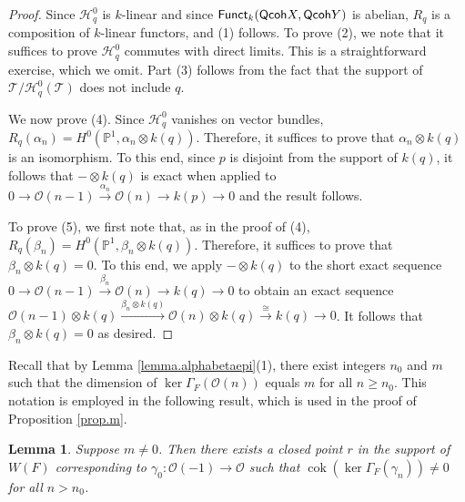 \documentclass[10pt]{amsart}
\newtheorem{lemma}{Lemma}[section]
\theoremstyle{definition}
\theoremstyle{remark}
\numberwithin{equation}{section}
\begin{document}
\begin{proof}
Since $\mathcal{H}_{q}^{0}$ is $k$-linear and since ${\sf Funct}_{k}({\sf Qcoh }X,{\sf Qcoh }Y)$ is abelian, $R_{q}$ is a composition of $k$-linear functors, and (1) follows.  To prove (2), we note that it suffices to prove $\mathcal{H}_{q}^{0}$ commutes with direct limits.  This is a straightforward exercise, which we omit.  Part (3) follows from the fact that the support of $\mathcal{T}/\mathcal{H}_{q}^{0}(\mathcal{T})$ does not include $q$.

We now prove (4).  Since $\mathcal{H}_{q}^{0}$ vanishes on vector bundles, $R_{q}(\alpha_{n})=H^{0}(\mathbb{P}^{1},\alpha_{n}\otimes k(q))$.  Therefore, it suffices to prove that $\alpha_{n}\otimes k(q)$ is an isomorphism.  To this end, since $p$ is disjoint from the support of $k(q)$, it follows that $-\otimes k(q)$ is exact when applied to
$0 \rightarrow \mathcal{O}(n-1) \overset{\alpha_{n}}{\rightarrow} \mathcal{O}(n) \rightarrow k(p) \rightarrow 0$
and the result follows.

To prove (5), we first note that, as in the proof of (4), $R_{q}(\beta_{n})=H^{0}(\mathbb{P}^{1},\beta_{n}\otimes k(q))$.  Therefore, it suffices to prove that $\beta_{n}\otimes k(q)=0$.  To this end, we apply $-\otimes k(q)$ to the short exact sequence $0 \rightarrow \mathcal{O}(n-1) \overset{\beta_{n}}{\rightarrow} \mathcal{O}(n) \rightarrow k(q) \rightarrow 0$ to obtain an exact sequence $\mathcal{O}(n-1)\otimes k(q) \overset{\beta_{n}\otimes k(q)}{\rightarrow} \mathcal{O}(n)\otimes k(q) \overset{\cong}{\rightarrow} k(q) \rightarrow 0$.  It follows that $\beta_{n}\otimes k(q)=0$ as desired.
\end{proof}

Recall that by Lemma \ref{lemma.alphabetaepi}(1), there exist integers $n_{0}$ and $m$ such that the dimension of ${\operatorname{ker }\Gamma_{F}}(\mathcal{O}(n))$ equals $m$ for all $n \geq n_{0}$.  This notation is employed in the following result, which is used in the proof of Proposition \ref{prop.m}.

\begin{lemma} \label{lemma.cokker}
Suppose $m \neq 0$.  Then there exists a closed point $r$ in the support of $W(F)$ corresponding to $\gamma_{0}:\mathcal{O}(-1) \rightarrow \mathcal{O}$ such that  $\operatorname{cok }({\operatorname{ker }\Gamma_{F}}(\gamma_{n})) \neq 0$ for all $n>n_{0}$.
\end{lemma}
\end{document}
